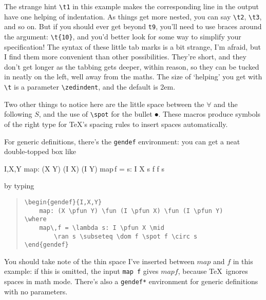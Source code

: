The strange hint \verb|\t1| in this example makes the corresponding
line in the output have one helping of indentation.
As things get more nested, you can say \verb|\t2|, \verb|\t3|, and so on.
But if you should ever get beyond \verb|t9|, you'll need to use braces
around the argument: \verb|\t{10}|, and you'd better look for some way
to simplify your specification!
The syntax of these little tab marks is a bit strange, I'm afraid,
but I find them more convenient than other possibilities. They're short,
and they don't get longer as the tabbing gets deeper, within reason,
so they can be tucked in neatly on the left, well away from the
maths.
The size of `helping' you get with \verb|\t| is a parameter
\verb|\zedindent|, and the default is 2em.

Two other things to notice here are the little space between the
$\forall$ and the following $S$, and the use of \verb|\spot| for
the bullet $\spot$.
These macros produce symbols of the right type for \TeX's spacing
rules to insert spaces automatically.

For generic definitions, there's the \verb|gendef| environment:
you can get a neat double-topped box like
\begin{gendef}{I,X,Y}
    map: (X \pfun Y) \fun (I \pfun X) \fun (I \pfun Y)
\where
    map\,f = \lambda s: I \pfun X \mid
        \ran s \subseteq \dom f \spot f \circ s
\end{gendef}
by typing
\begin{quote}
\begin{verbatim}
\begin{gendef}{I,X,Y}
    map: (X \pfun Y) \fun (I \pfun X) \fun (I \pfun Y)
\where
    map\,f = \lambda s: I \pfun X \mid
        \ran s \subseteq \dom f \spot f \circ s
\end{gendef}
\end{verbatim}
\end{quote}
You should take note of the thin space I've inserted between $map$ and $f$
in this example: if this is omitted, the input \verb|map f| gives
$map f$, because \TeX\ ignores spaces in math mode.
There's also a \verb|gendef*| environment for generic definitions with no
parameters.

